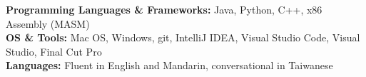 

\begin{cvparagraph}

\textbf{Programming Languages \& Frameworks:} Java, Python, C++, x86 Assembly (MASM)
\\[2pt]
\textbf{OS \& Tools:} Mac OS, Windows, git, IntelliJ IDEA, Visual Studio Code, Visual Studio, Final Cut Pro
\\[2pt]
\textbf{Languages:} Fluent in English and Mandarin, conversational in Taiwanese
\\[2pt]


\end{cvparagraph}
